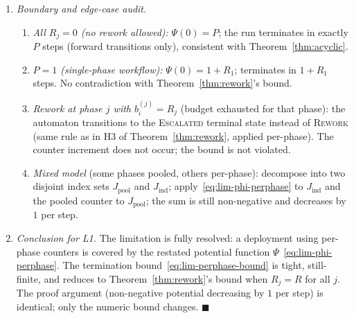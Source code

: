\documentclass[12pt]{article}
\theoremstyle{definition}
\begin{document}
\begin{enumerate}
    \item \emph{Boundary and edge-case audit.}
          \begin{enumerate}
              \item[L1-E1] \emph{All $R_j = 0$ (no rework allowed):}
                           $\Psi(0) = P$; the run terminates in exactly
                           $P$ steps (forward transitions only), consistent
                           with Theorem~\ref{thm:acyclic}.
              \item[L1-E2] \emph{$P = 1$ (single-phase workflow):}
                           $\Psi(0) = 1 + R_1$; terminates in
                           $1 + R_1$ steps.  No contradiction with
                           Theorem~\ref{thm:rework}'s bound.
              \item[L1-E3] \emph{Rework at phase $j$ with $b^{(j)}_i =
                           R_j$} (budget exhausted for that phase):
                           the automaton transitions to the
                           \textsc{Escalated} terminal state instead of
                           \textsc{Rework} (same rule as in H3 of
                           Theorem~\ref{thm:rework}, applied per-phase).
                           The counter increment does not occur; the
                           bound is not violated.
              \item[L1-E4] \emph{Mixed model} (some phases pooled,
                           others per-phase): decompose into two disjoint
                           index sets $J_{\mathrm{pool}}$ and
                           $J_{\mathrm{ind}}$; apply~\eqref{eq:lim-phi-perphase}
                           to $J_{\mathrm{ind}}$ and the pooled counter to
                           $J_{\mathrm{pool}}$; the sum is still
                           non-negative and decreases by $1$ per step.
          \end{enumerate}

    \item \emph{Conclusion for L1.}
          The limitation is fully resolved: a deployment using
          per-phase counters is covered by the restated potential
          function $\Psi$~\eqref{eq:lim-phi-perphase}.  The
          termination bound~\eqref{eq:lim-perphase-bound} is tight,
          still-finite, and reduces to Theorem~\ref{thm:rework}'s
          bound when $R_j = R$ for all $j$.  The proof argument
          (non-negative potential decreasing by $1$ per step) is
          identical; only the numeric bound changes.
          $\blacksquare$
\end{enumerate}
\end{document}
